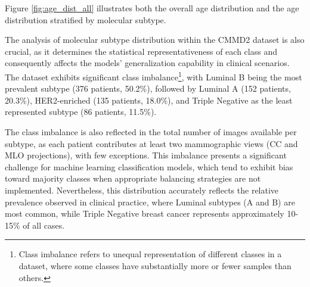 \documentclass[a4paper,10pt]{book}
\begin{document}
Figure \ref{fig:age_dist_all} illustrates both the overall age distribution and the age distribution stratified by molecular subtype.

The analysis of molecular subtype distribution within the CMMD2 dataset is also crucial, as it determines the statistical representativeness of each class and consequently affects the models' generalization capability in clinical scenarios. The dataset exhibits significant class imbalance\footnote{Class imbalance refers to unequal representation of different classes in a dataset, where some classes have substantially more or fewer samples than others.}, with Luminal B being the most prevalent subtype (376 patients, 50.2\%), followed by Luminal A (152 patients, 20.3\%), HER2-enriched (135 patients, 18.0\%), and Triple Negative as the least represented subtype (86 patients, 11.5\%).

The class imbalance is also reflected in the total number of images available per subtype, as each patient contributes at least two mammographic views (CC and MLO projections), with few exceptions. This imbalance presents a significant challenge for machine learning classification models, which tend to exhibit bias toward majority classes when appropriate balancing strategies are not implemented. Nevertheless, this distribution accurately reflects the relative prevalence observed in clinical practice, where Luminal subtypes (A and B) are most common, while Triple Negative breast cancer represents approximately 10-15\% of all cases.
\end{document}
